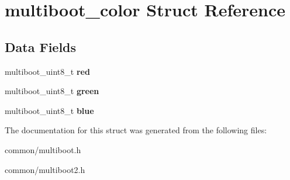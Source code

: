 \hypertarget{structmultiboot__color}{}\section{multiboot\+\_\+color Struct Reference}
\label{structmultiboot__color}
\subsection*{Data Fields}
\begin{DoxyCompactItemize}
\item 
multiboot\+\_\+uint8\+\_\+t {\bfseries red}\hypertarget{structmultiboot__color_a4c8a91229f40c06c3c63b4c37e83d219}{}\label{structmultiboot__color_a4c8a91229f40c06c3c63b4c37e83d219}

\item 
multiboot\+\_\+uint8\+\_\+t {\bfseries green}\hypertarget{structmultiboot__color_a08e1c8bc977b39015c9043645e79713d}{}\label{structmultiboot__color_a08e1c8bc977b39015c9043645e79713d}

\item 
multiboot\+\_\+uint8\+\_\+t {\bfseries blue}\hypertarget{structmultiboot__color_a6f8d17b0f35ff4cbf9c51dcbc3ea7d01}{}\label{structmultiboot__color_a6f8d17b0f35ff4cbf9c51dcbc3ea7d01}

\end{DoxyCompactItemize}


The documentation for this struct was generated from the following files\+:\begin{DoxyCompactItemize}
\item 
common/multiboot.\+h\item 
common/multiboot2.\+h\end{DoxyCompactItemize}
